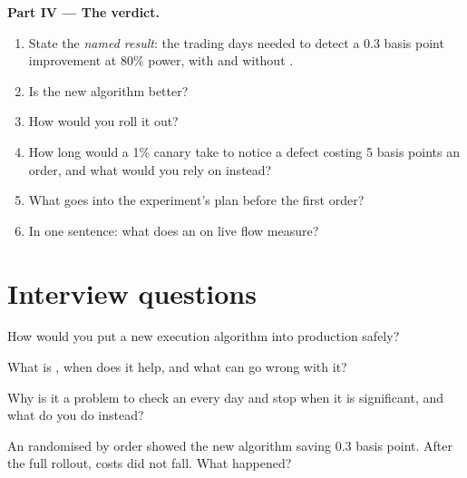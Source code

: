 \begin{problem}
\medskip\noindent\textbf{Part IV --- The verdict.}
\begin{enumerate}[resume]
\item State the \emph{named result}: the trading days needed to detect a 0.3 basis point improvement at 80\% power, with and without .
\item Is the new algorithm better?
\item How would you roll it out?
\item How long would a 1\% canary take to notice a defect costing 5 basis points an order, and what would you rely on instead?
\item What goes into the experiment's plan before the first order?
\item In one sentence: what does an  on live flow measure?
\end{enumerate}
\end{problem}

\section{Interview questions}

\begin{interviewq}\label{iq:rs:live-experiments:1}
How would you put a new execution algorithm into production safely?
\end{interviewq}

\begin{interviewq}\label{iq:rs:live-experiments:2}
What is , when does it help, and what can go wrong with it?
\end{interviewq}

\begin{interviewq}\label{iq:rs:live-experiments:3}
Why is it a problem to check an  every day and stop when it is significant, and what do you do instead?
\end{interviewq}

\begin{interviewq}\label{iq:rs:live-experiments:4}
An  randomised by order showed the new algorithm saving 0.3 basis point. After the full rollout, costs did not fall. What happened?
\end{interviewq}

